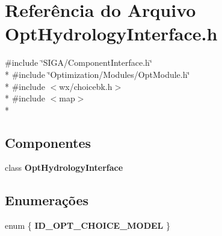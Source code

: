 \section{Referência do Arquivo Opt\+Hydrology\+Interface.\+h}
\label{_opt_hydrology_interface_8h}
{\ttfamily \#include \char`\"{}S\+I\+G\+A/\+Component\+Interface.\+h\char`\"{}}\\*
{\ttfamily \#include \char`\"{}Optimization/\+Modules/\+Opt\+Module.\+h\char`\"{}}\\*
{\ttfamily \#include $<$wx/choicebk.\+h$>$}\\*
{\ttfamily \#include $<$map$>$}\\*
\subsection*{Componentes}
\begin{DoxyCompactItemize}
\item 
class {\bf Opt\+Hydrology\+Interface}
\end{DoxyCompactItemize}
\subsection*{Enumerações}
\begin{DoxyCompactItemize}
\item 
enum \{ {\bf I\+D\+\_\+\+O\+P\+T\+\_\+\+C\+H\+O\+I\+C\+E\+\_\+\+M\+O\+D\+EL}
 \}
\end{DoxyCompactItemize}
